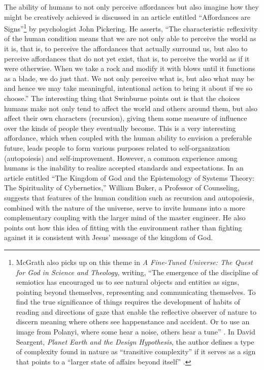 The ability of humans to not only perceive affordances but also imagine
how they might be creatively achieved is discussed in an article
entitled ``Affordances are Signs''\footnote{
McGrath also picks up on this
theme in \textit{A Fine-Tuned Universe: The Quest
for God in Science and Theology}, writing, ``The emergence of the discipline of semiotics
has encouraged us to see natural objects and entities as signs,
pointing beyond themselves, representing and communicating themselves.
To find the true significance of things requires the development of
habits of reading and directions of gaze that enable the reflective
observer of nature to discern meaning where others see happenstance and
accident. Or to use an image from Polanyi, where some hear a noise,
others hear a tune” \citep[][pg. 3]{mcgrath2009}. In David Seargent, \textit{Planet Earth and the
Design Hypothesis}, the author defines a
type of complexity found in nature as “transitive complexity” if it
serves as a sign that points to a “larger state of affairs beyond
itself” \citep{seargent2007}.
} by psychologist
John Pickering.\citep{pickering2007} He asserts, ``The characteristic reflexivity of the
human condition means that we are not only able to perceive the world
as it is, that is, to perceive the affordances that actually surround
us, but also to perceive affordances that do not yet exist, that is, to
perceive the world as if it were otherwise. When we take a rock and
modify it with blows until it functions as a blade, we do just that. We
not only perceive what is, but also what may be and hence we may take
meaningful, intentional action to bring it about if we so choose.'' 
The
interesting thing that Swinburne points out is that the choices humans
make not only tend to affect the world and others around them, but also
affect their own characters (recursion), giving them some measure of
influence over the kinds of people they eventually become. This is a
very interesting affordance, which when coupled with the human ability
to envision a preferable future, leads people to form various purposes
related to self-organization (autopoiesis) and self-improvement.
However, a common experience among humans is the inability to realize
accepted standards and expectations. In an article entitled “The
Kingdom of God and the Epistemology of Systems Theory: The Spirituality
of Cybernetics,”\citep{buker2009} William Buker, a Professor of
Counseling, suggests that features of the human condition such as
recursion and autopoiesis, combined with the nature of the universe,
serve to invite humans into a more complementary coupling with the
larger mind of the master engineer. He also points out how this idea of
fitting with the environment rather than fighting against it is
consistent with Jesus’ message of the kingdom of God.

